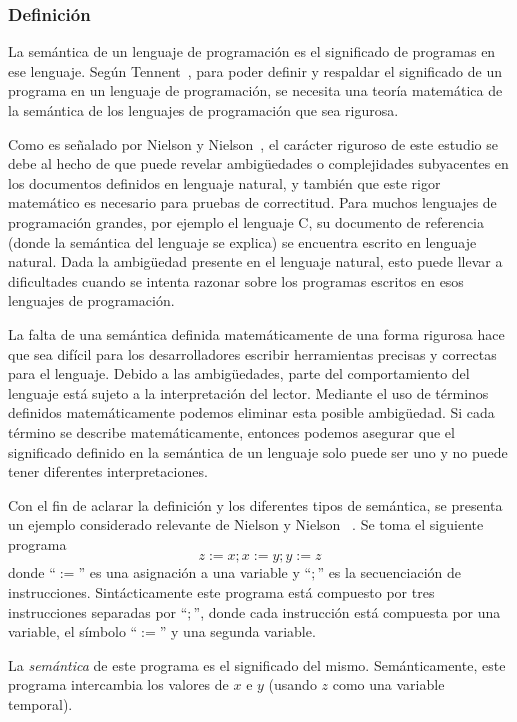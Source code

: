 \subsubsection*{Definición}

La semántica de un lenguaje de programación es el significado de programas en ese lenguaje.
Según Tennent~\citeyearpar{tennent}, para poder definir y respaldar el significado de un programa en un lenguaje de programación, se necesita una teoría matemática de la semántica de los lenguajes de programación que sea rigurosa.

Como es señalado por Nielson y Nielson~\citeyearpar{nielson}, el carácter riguroso de este estudio se debe al hecho de que puede revelar ambigüedades o complejidades subyacentes en los documentos definidos en lenguaje natural, y también que este rigor matemático es necesario para pruebas de correctitud.
Para muchos lenguajes de programación grandes, por ejemplo el lenguaje C, su documento de referencia (donde la semántica del lenguaje se explica) se encuentra escrito en lenguaje natural.
Dada la ambigüedad presente en el lenguaje natural, esto puede llevar a dificultades cuando se intenta razonar sobre los programas escritos en esos lenguajes de programación.

La falta de una semántica definida matemáticamente de una forma rigurosa hace que sea difícil para los desarrolladores escribir herramientas precisas y correctas para el lenguaje.
Debido a las ambigüedades, parte del comportamiento del lenguaje está sujeto a la interpretación del lector.
Mediante el uso de términos definidos matemáticamente podemos eliminar esta posible ambigüedad.
Si cada término se describe matemáticamente, entonces podemos asegurar que el significado definido en la semántica de un lenguaje solo puede ser uno y no puede tener diferentes interpretaciones.

Con el fin de aclarar la definición y los diferentes tipos de semántica, se presenta un ejemplo considerado relevante de Nielson y Nielson ~\citeyearpar{nielson}.
Se toma el siguiente programa
\begin{equation*}
z:=x; x:=y; y:=z
\end{equation*}
donde ``$:=$'' es una asignación a una variable y ``$;$'' es la secuenciación de instrucciones.
Sintácticamente este programa está compuesto por tres instrucciones separadas por ``$;$'', donde cada instrucción está compuesta por una variable, el símbolo ``$:=$'' y una segunda variable.

La \textit{semántica} de este programa es el significado del mismo.
Semánticamente, este programa intercambia los valores de $x$ e $y$ (usando $z$ como una variable temporal).

